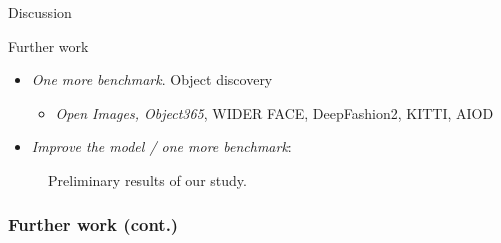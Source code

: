 \documentclass[aspectratio=169]{beamer}
\begin{document}
\begin{section}{Discussion}
\begin{subsection}{Further work}
\begin{frame}
\begin{itemize}
    \item \emph{One more benchmark}. Object discovery
    \begin{itemize}
        \item \emph{Open Images, Object365}, WIDER FACE, DeepFashion2, KITTI, AIOD
    \end{itemize}
    \item \emph{Improve the model / one more benchmark}:
\end{itemize}
\begin{figure}[t]
    \centering
    \caption{
        Preliminary results of our study.
    }
\end{figure}

\end{frame}

\begin{frame}
\frametitle{Further work (cont.)}


\end{frame}
\end{subsection}
\end{section}
\end{document}
